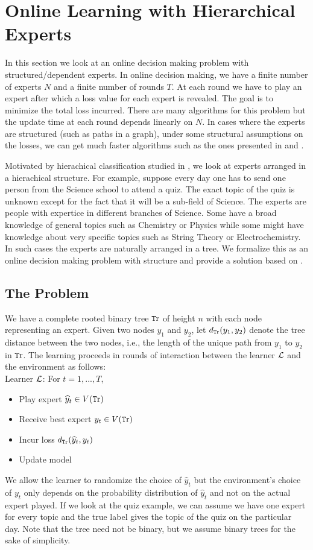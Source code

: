 \section{Online Learning with Hierarchical Experts}\label{sec:online}
In this section we look at an online decision making problem with structured/dependent experts. In online decision making, we have a finite number of experts $N$ and a finite number of rounds $T$. At each round we have to play an expert after which a loss value for each expert is revealed. The goal is to minimize the total loss incurred. There are many algorithms for this problem but the update time at each round depends linearly on $N$. In cases where the experts are structured (such as paths in a graph), under some structural assumptions on the losses, we can get much faster algorithms such as the ones presented in \cite{koolen2010hedging} and \cite{cortes2015line}. 

Motivated by hierachical classification studied in \cite{ramaswamy2015convex}, we look at experts arranged in a hierachical structure. For example, suppose every day one has to send one person from the Science school to attend a quiz. The exact topic of the quiz is unknown except for the fact that it will be a sub-field of Science. The experts are people with expertice in different branches of Science. Some have a broad knowledge of general topics such as Chemistry or Physics while some might have knowledge about very specific topics such as String Theory or Electrochemistry. In such cases the experts are naturally arranged in a tree. We formalize this as an online decision making problem with structure and provide a solution based on \cite{cortes2015line}.

\subsection{The Problem}
We have a complete rooted binary tree $\text{\texttt Tr}$ of height $n$ with each node representing an expert. Given two nodes $y_1$ and $y_2$, let $d_{\text{\texttt Tr}}(y_1,y_2)$ denote the tree distance between the two nodes, i.e., the length of the unique path from $y_1$ to $y_2$ in $\text{\texttt Tr}$. The learning proceeds in rounds of interaction between the learner ${\mathcal L}$ and the environment as follows:\\

Learner ${\mathcal L}$: For $t = 1,...,T$,
\begin{itemize}
 \item Play expert $\widehat{y}_t \in V(\text{\texttt Tr})$
 \item Receive best expert $y_t \in V(\text{\texttt Tr})$
 \item Incur loss $d_{\text{\texttt Tr}}(\widehat{y}_t,y_t)$
 \item Update model
\end{itemize}
We allow the learner to randomize the choice of $\hat{y}_t$ but the environment's choice of $y_t$ only depends on the probability distribution of $\hat{y}_t$ and not on the actual expert played. If we look at the quiz example, we can assume we have one expert for every topic and the true label gives the topic of the quiz on the particular day. Note that the tree need not be binary, but we assume binary trees for the sake of simplicity. 

